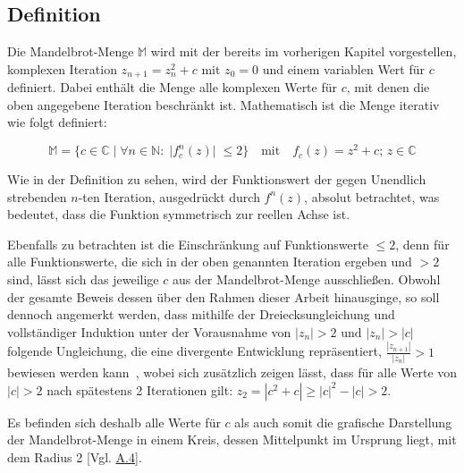 \subsection{Definition}\label{subsec:definition}

Die Mandelbrot-Menge $\mathbb{M}$ wird mit der bereits im vorherigen Kapitel vorgestellen,
komplexen Iteration $z_{n+1} = z_n^2 + c \text{ mit } z_0 = 0$ und einem variablen
Wert für $c$~\cite*[S.477ff.]{weitz_konkrete_2018} definiert.
Dabei enthält die Menge alle komplexen Werte für $c$, mit denen die
oben angegebene Iteration beschränkt ist.
Mathematisch ist die Menge iterativ wie folgt definiert:

\begin{equation}\label{eq:mathematical-definition}
  \mathbb{M} = \{c \in \mathbb{C} \; |\;  \forall n \in \mathbb{N}:\; |f_c^n(z)|\; \leqslant 2\}
  \quad
  \text{mit}
  \quad
  f_c(z) = z^2 + c;\, z \in \mathbb{C}
\end{equation}

Wie in der Definition zu sehen, wird der Funktionswert der
gegen Unendlich strebenden $n$-ten Iteration, ausgedrückt durch $f^n(z)$,
absolut betrachtet, was bedeutet, dass die Funktion symmetrisch zur reellen Achse ist.

Ebenfalls zu betrachten ist die Einschränkung auf Funktionswerte $\leqslant 2$, denn
für alle Funktionswerte, die sich in der oben genannten Iteration ergeben
und $> 2$ sind, lässt sich das jeweilige $c$ aus der Mandelbrot-Menge
ausschließen.
Obwohl der gesamte Beweis dessen über den Rahmen dieser Arbeit hinausginge,
so soll dennoch angemerkt werden, dass mithilfe der Dreiecksungleichung und
vollständiger Induktion unter der Vorausnahme von $|z_n| > 2 \text{ und } |z_n| > |c|$
folgende Ungleichung, die eine divergente Entwicklung repräsentiert,
$\frac{|z_{n+1}|}{|z_n|} > 1$ bewiesen werden kann~\cite{munafo_escape_1997},
wobei sich zusätzlich zeigen lässt, dass für alle Werte von $|c| > 2$
nach spätestens 2 Iterationen gilt: $z_2 = |c^2 + c| \geqslant |c|^2 - |c| > 2$.

Es befinden sich deshalb alle Werte für $c$ als auch somit die grafische Darstellung
der Mandelbrot-Menge in einem Kreis, dessen Mittelpunkt im Ursprung liegt,
mit dem Radius 2 [Vgl. \hyperref[app:4]{A.4}].